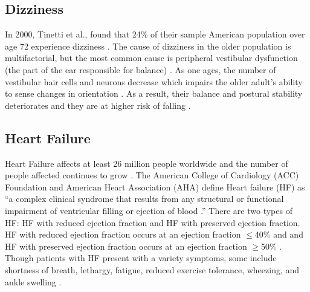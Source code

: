\subsection{Dizziness}
In 2000, Tinetti et al., found that 24\% of their sample American population over age 72 experience dizziness \cite{tinetti_dizziness_2000}. The cause of dizziness in the older population is multifactorial, but the most common cause is peripheral vestibular dysfunction (the part of the ear responsible for balance) \cite{iwasaki_dizziness_2014}. As one ages, the number of vestibular hair cells and neurons decrease which impairs the older adult's ability to sense changes in orientation \cite{iwasaki_dizziness_2014}. As a result, their balance and postural stability deteriorates and they are at higher risk of falling \cite{iwasaki_dizziness_2014}.

\subsection{Heart Failure} 
Heart Failure affects at least 26 million people worldwide and the number of people affected continues to grow \cite{savarese_global_2017}. The American College of Cardiology (ACC) Foundation and American Heart Association (AHA) define Heart failure (HF) as “a complex clinical syndrome that results from any structural or functional impairment of ventricular filling or ejection of blood \cite{ziaeian_epidemiology_2016}.” There are two types of HF: HF with reduced ejection fraction and HF with preserved ejection fraction. HF with reduced ejection fraction occurs at an ejection fraction $\leq$40\% and and HF with preserved ejection fraction occurs at an ejection fraction $\geq$50\% \cite{ziaeian_epidemiology_2016}. Though patients with HF present with a variety symptoms, some include shortness of breath, lethargy, fatigue, reduced exercise tolerance, wheezing, and ankle swelling \cite{watson_clinical_2000}.

